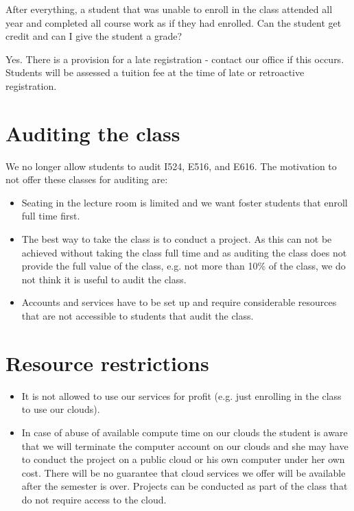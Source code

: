 After everything, a student that was unable to enroll in the class
attended all year and completed all course work as if they had enrolled.
Can the student get credit and can I give the student a grade?

Yes. There is a provision for a late registration - contact our office
if this occurs. Students will be assessed a tuition fee at the time of
late or retroactive registration.

\section{Auditing the class}\label{auditing-the-class}

We no longer allow students to audit I524, E516, and E616. The
motivation to not offer these classes for auditing are:

\begin{itemize}
\item Seating in the lecture room is limited and we want foster
  students that enroll full time first.

\item The best way to take the class is to conduct a project. As this can
not be achieved without taking the class full time and as auditing the
class does not provide the full value of the class, e.g. not more than
10\% of the class, we do not think it is useful to audit the class.

\item  Accounts and services have to be set up and require
  considerable resources that are not accessible to students that
  audit the class.

\end{itemize}


\section{Resource restrictions}

\begin{itemize}
\item It is not allowed to use our services for profit (e.g. just
  enrolling in the class to use our clouds).
\item In case of abuse of available compute time on our clouds the
  student is aware that we will terminate the computer account on our
  clouds and she may have to conduct the project on a public cloud or
  his own computer under her own cost. There will be no guarantee that
  cloud services we offer will be available after the semester is
  over.  Projects can be conducted as part of the class that do not
  require access to the cloud.
\end{itemize}

